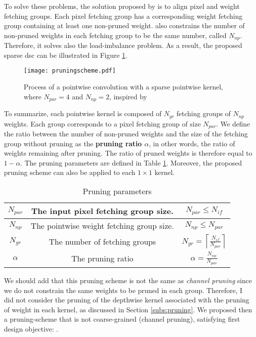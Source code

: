 To solve these problems, the solution proposed by \textcite{kang_accelerator-aware_2020} is to align pixel and weight fetching groups. Each pixel fetching group has a corresponding weight fetching group containing at least one non-pruned weight. \textcite{kang_accelerator-aware_2020} also constrains the number of non-pruned weights in each fetching group to be the same number, called $N_{np}$. Therefore, it solves also the load-imbalance problem. As a result, the proposed sparse \acrshort{dsc} can be illustrated in Figure \ref{fig:prunedwg}.
%
\begin{figure}[H]
    \centering
    \texttt{[image: pruningscheme.pdf]}
    \caption{Process of a pointwise convolution with a sparse pointwise kernel, where $N_{par} = 4$ and $N_{np} = 2$, inspired by \cite{kang_accelerator-aware_2020}}
    \label{fig:prunedwg}
\end{figure}
%
To summarize, each pointwise kernel is composed of $N_{gr}$ fetching groups of $N_{np}$ weights. Each group corresponds to a pixel fetching group of size $N_{par}$. We define the ratio between the number of non-pruned weights and the size of the fetching group without pruning as the \textbf{pruning ratio $\alpha$}, in other words, the ratio of weights remaining after pruning. The ratio of pruned weights is therefore equal to $1 - \alpha$. The pruning parameters are defined in Table \ref{tab:pr_param}. Moreover, the proposed pruning scheme can also be applied to each $1 \times 1$ kernel.
%
\begin{table}[H]
    \center
    \begin{tabular}{|c|c|c|}
        \hline
        $N_{par}$ & The input pixel fetching group size. & $N_{par} \leq N_{if}$ \\
        \hline
        $N_{np}$  & The pointwise weight fetching group size. & $N_{np} \leq N_{par}$ \\
        \hline
        $N_{gr}$  & The number of fetching groups & $N_{gr} = \left\lceil \frac{N_{if}}{N_{par}} \right\rceil $ \\
        \hline
        $\alpha$  & The pruning ratio & $\alpha = \frac{N_{np}}{N_{par}}  $ \\
        \hline
    \end{tabular}
    \caption{Pruning parameters}
    \label{tab:pr_param}
\end{table}
%
We should add that this pruning scheme is not the same as \textit{channel pruning} since we do not constrain the same weights to be pruned in each group. Therefore, I did not consider the pruning of the depthwise kernel associated with the pruning of weight in each kernel, as discussed in Section \ref{subs:pruning}. We proposed then a pruning-scheme that is not coarse-grained (channel pruning), satisfying first design objective: \textbf{}.
%
